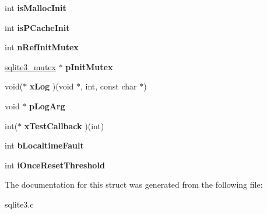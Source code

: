 \begin{DoxyCompactItemize}
\item 
int {\bfseries is\+Malloc\+Init}\hypertarget{structSqlite3Config_ab0ec050075ee245df0a54623b0073bfc}{}\label{structSqlite3Config_ab0ec050075ee245df0a54623b0073bfc}

\item 
int {\bfseries is\+P\+Cache\+Init}\hypertarget{structSqlite3Config_a945ec3af8fd8f2efaccec88e2597393b}{}\label{structSqlite3Config_a945ec3af8fd8f2efaccec88e2597393b}

\item 
int {\bfseries n\+Ref\+Init\+Mutex}\hypertarget{structSqlite3Config_a423f5c1b3f68d9c569661a542ebe7220}{}\label{structSqlite3Config_a423f5c1b3f68d9c569661a542ebe7220}

\item 
\hyperlink{structsqlite3__mutex}{sqlite3\+\_\+mutex} $\ast$ {\bfseries p\+Init\+Mutex}\hypertarget{structSqlite3Config_af8ffb8388972c384840dd36beca35e7e}{}\label{structSqlite3Config_af8ffb8388972c384840dd36beca35e7e}

\item 
void($\ast$ {\bfseries x\+Log} )(void $\ast$, int, const char $\ast$)\hypertarget{structSqlite3Config_a3d9750f6c4fc73fdce5f83357184faae}{}\label{structSqlite3Config_a3d9750f6c4fc73fdce5f83357184faae}

\item 
void $\ast$ {\bfseries p\+Log\+Arg}\hypertarget{structSqlite3Config_a501ab4552bc7c54bb413aced5889dcdc}{}\label{structSqlite3Config_a501ab4552bc7c54bb413aced5889dcdc}

\item 
int($\ast$ {\bfseries x\+Test\+Callback} )(int)\hypertarget{structSqlite3Config_a6d21468c424041f10eb0c251220088f6}{}\label{structSqlite3Config_a6d21468c424041f10eb0c251220088f6}

\item 
int {\bfseries b\+Localtime\+Fault}\hypertarget{structSqlite3Config_a7bdc3109ecd839317f722b5da5339fab}{}\label{structSqlite3Config_a7bdc3109ecd839317f722b5da5339fab}

\item 
int {\bfseries i\+Once\+Reset\+Threshold}\hypertarget{structSqlite3Config_aed7a7e3bd6862ff2ca1444e16ad3948f}{}\label{structSqlite3Config_aed7a7e3bd6862ff2ca1444e16ad3948f}

\end{DoxyCompactItemize}


The documentation for this struct was generated from the following file\+:\begin{DoxyCompactItemize}
\item 
sqlite3.\+c\end{DoxyCompactItemize}
